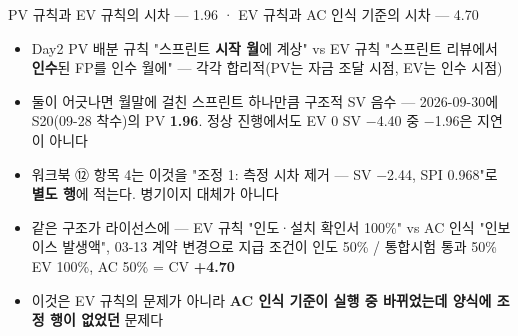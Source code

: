 \begin{frame}{PV 규칙과 EV 규칙의 시차 — 1.96 · EV 규칙과 AC 인식 기준의 시차 — 4.70}
\begin{itemize}
\item Day2 PV 배분 규칙 "스프린트 \textbf{시작 월}에 계상" vs EV 규칙 "스프린트 리뷰에서 \textbf{인수}된 FP를 인수 월에" — 각각 합리적(PV는 자금 조달 시점, EV는 인수 시점)
\item 둘이 어긋나면 월말에 걸친 스프린트 하나만큼 구조적 SV 음수 — 2026-09-30에 S20(09-28 착수)의 PV \textbf{1.96}. 정상 진행에서도 EV 0 \ra{} SV $-$4.40 중 $-$1.96은 지연이 아니다
\item 워크북 ⑫ 항목 4는 이것을 "조정 1: 측정 시차 제거 — SV $-$2.44, SPI 0.968"로 \textbf{별도 행}에 적는다. 병기이지 대체가 아니다
\item 같은 구조가 라이선스에 — EV 규칙 "인도·설치 확인서 100\%" vs AC 인식 "인보이스 발생액", 03-13 계약 변경으로 지급 조건이 인도 50\% / 통합시험 통과 50\% \ra{} EV 100\%, AC 50\% = CV \textbf{+4.70}
\item 이것은 EV 규칙의 문제가 아니라 \textbf{AC 인식 기준이 실행 중 바뀌었는데 양식에 조정 행이 없었던} 문제다
\end{itemize}
\end{frame}

